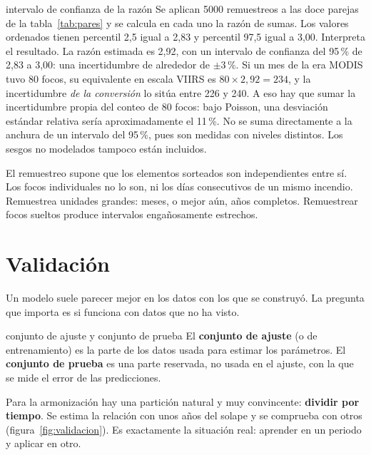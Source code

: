 \begin{ejemplo}{intervalo de confianza de la razón}
Se aplican 5000 remuestreos a las doce parejas de la tabla~\ref{tab:pares} y se calcula en cada
uno la razón de sumas. Los valores ordenados tienen percentil 2,5 igual a 2,83 y percentil 97,5
igual a 3,00. Interpreta el resultado.
\solucion La razón estimada es 2,92, con un intervalo de confianza del 95\,{}\% de 2,83 a 3,00:
una incertidumbre de alrededor de $\pm 3\,{}\%$. Si un mes de la era MODIS tuvo 80 focos, su
equivalente en escala VIIRS es $80 \times 2{,}92 = 234$, y la incertidumbre \emph{de la
conversión} lo sitúa entre 226 y 240. A eso hay que sumar la incertidumbre propia del conteo de
80 focos: bajo Poisson, una desviación estándar relativa sería aproximadamente el
11\,{}\%. No se suma directamente a la anchura de un intervalo del 95\,{}\%, pues
son medidas con niveles distintos. Los sesgos no modelados tampoco están incluidos.
\end{ejemplo}

\begin{atencion}
El remuestreo supone que los elementos sorteados son independientes entre sí. Los focos
individuales no lo son, ni los días consecutivos de un mismo incendio. Remuestrea unidades
grandes: meses, o mejor aún, años completos. Remuestrear focos sueltos produce intervalos
engañosamente estrechos.
\end{atencion}

\section{Validación}\label{sec:validacion}

Un modelo suele parecer mejor en los datos con los que se construyó. La pregunta que importa
es si funciona con datos que no ha visto.

\begin{definicion}{conjunto de ajuste y conjunto de prueba}
El \textbf{conjunto de ajuste} (o de entrenamiento) es la parte de los datos usada para estimar
los parámetros. El \textbf{conjunto de prueba} es una parte reservada, no usada en el ajuste,
con la que se mide el error de las predicciones.
\end{definicion}

Para la armonización hay una partición natural y muy convincente: \textbf{dividir por tiempo}.
Se estima la relación con unos años del solape y se comprueba con otros
(figura~\ref{fig:validacion}). Es exactamente la situación real: aprender en un periodo y
aplicar en otro.

